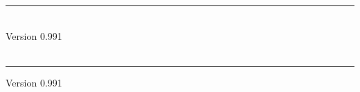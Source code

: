 \documentclass[twocolumn,wd,9pt]{isov2}
\newcommand{\version}{0.991}
\renewcommand{\extrahead}{Version \version}
\begin{document}
\begin{cover}
    \vspace*{\fill}
    \hrule
    \vspace{0.3cm}
    {\Huge \thestandard} \\
    \vspace{0.3cm}
    {\LARGE Version \version} \\
    \ISname \\
    \vspace{0.5cm}
    \hrule
    \clearpage
\end{cover}



\title{}{\thestandard}{\extrahead}






\newpage
\newpage

\gdef\module{telos0} \newpage
\gdef\module{threads} \newpage
\gdef\module{condition} \newpage
\gdef\module{eulisp0} \newpage

\label{annex:level-0}

\gdef\module{character} 
\gdef\module{collection} \newpage
\gdef\module{compare} \newpage
\gdef\module{convert} \newpage
\gdef\module{copy} \newpage
\gdef\module{double} \newpage
\gdef\module{mathlib} \newpage
\gdef\module{float} \newpage
\gdef\module{fpint} \newpage
\gdef\module{formatted-io} \newpage
\gdef\module{integer} \newpage
\gdef\module{keyword} \newpage
\gdef\module{list} \newpage
\gdef\module{number} \newpage
\gdef\module{stream} \newpage
\gdef\module{string} \newpage
\gdef\module{symbol} \newpage
\gdef\module{table} \newpage
\gdef\module{vector} \newpage
\gdef\module{level-0}\newpage
\end{document}
